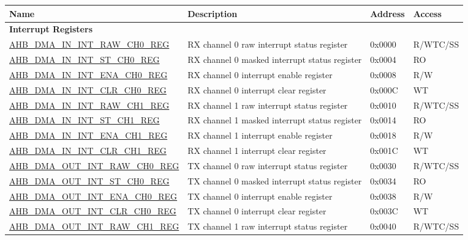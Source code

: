 \begin{longtable}{ | p{8cm} | p{8cm} | p{1.3cm} | p{1.5cm} | }
\hline\rowcolor{lightgray}
\textbf{Name} & \textbf{Description} &  \textbf{Address} & \textbf{Access} \\ \hline
\endhead
\multicolumn{4}{|l|}{\textbf{Interrupt Registers}} \\ \hline
\hyperref[regdesc:AHBDMAININTRAWCHNREG]{AHB\_DMA\_IN\_INT\_RAW\_CH0\_REG} & RX channel 0 raw interrupt status register & 0x0000 & R/WTC/SS \\ \hline
\hyperref[regdesc:AHBDMAININTSTCHNREG]{AHB\_DMA\_IN\_INT\_ST\_CH0\_REG} & RX channel 0 masked interrupt status register & 0x0004 & RO \\ \hline
\hyperref[regdesc:AHBDMAININTENACHNREG]{AHB\_DMA\_IN\_INT\_ENA\_CH0\_REG} & RX channel 0 interrupt enable register & 0x0008 & R/W \\ \hline
\hyperref[regdesc:AHBDMAININTCLRCHNREG]{AHB\_DMA\_IN\_INT\_CLR\_CH0\_REG} & RX channel 0 interrupt clear register & 0x000C & WT \\ \hline
\hyperref[regdesc:AHBDMAININTRAWCHNREG]{AHB\_DMA\_IN\_INT\_RAW\_CH1\_REG} & RX channel 1 raw interrupt status register & 0x0010 & R/WTC/SS \\ \hline
\hyperref[regdesc:AHBDMAININTSTCHNREG]{AHB\_DMA\_IN\_INT\_ST\_CH1\_REG} & RX channel 1 masked interrupt status register & 0x0014 & RO \\ \hline
\hyperref[regdesc:AHBDMAININTENACHNREG]{AHB\_DMA\_IN\_INT\_ENA\_CH1\_REG} & RX channel 1 interrupt enable register & 0x0018 & R/W \\ \hline
\hyperref[regdesc:AHBDMAININTCLRCHNREG]{AHB\_DMA\_IN\_INT\_CLR\_CH1\_REG} & RX channel 1 interrupt clear register & 0x001C & WT \\ \hline
\hyperref[regdesc:AHBDMAOUTINTRAWCHNREG]{AHB\_DMA\_OUT\_INT\_RAW\_CH0\_REG} & TX channel 0 raw interrupt status register & 0x0030 & R/WTC/SS \\ \hline
\hyperref[regdesc:AHBDMAOUTINTSTCHNREG]{AHB\_DMA\_OUT\_INT\_ST\_CH0\_REG} & TX channel 0 masked interrupt status register & 0x0034 & RO \\ \hline
\hyperref[regdesc:AHBDMAOUTINTENACHNREG]{AHB\_DMA\_OUT\_INT\_ENA\_CH0\_REG} & TX channel 0 interrupt enable register & 0x0038 & R/W \\ \hline
\hyperref[regdesc:AHBDMAOUTINTCLRCHNREG]{AHB\_DMA\_OUT\_INT\_CLR\_CH0\_REG} & TX channel 0 interrupt clear register & 0x003C & WT \\ \hline
\hyperref[regdesc:AHBDMAOUTINTRAWCHNREG]{AHB\_DMA\_OUT\_INT\_RAW\_CH1\_REG} & TX channel 1 raw interrupt status register & 0x0040 & R/WTC/SS \\ \hline

\end{longtable}
